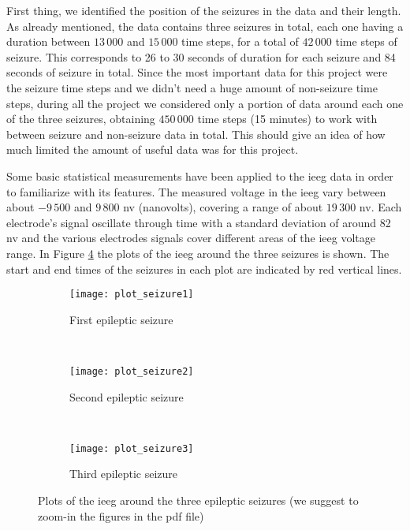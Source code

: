 First thing, we identified the position of the seizures in the data and their length. As already mentioned, the data contains three seizures in total, each one having a duration between $13\,000$ and $15\,000$ time steps, for a total of $42\,000$ time steps of seizure. This corresponds to 26 to 30 seconds of duration for each seizure and 84 seconds of seizure in total. Since the most important data for this project were the seizure time steps and we didn't need a huge amount of non-seizure time steps, during all the project we considered only a portion of data around each one of the three seizures, obtaining $450\,000$ time steps (15 minutes) to work with between seizure and non-seizure data in total. This should give an idea of how much limited the amount of useful data was for this project.

Some basic statistical measurements have been applied to the \acs{ieeg} data in order to familiarize with its features. The measured voltage in the \acs{ieeg} vary between about $-9\,500$ and $9\,800$ \acs{nv} (nanovolts), covering a range of about $19\,300$ \acs{nv}. Each electrode's signal oscillate through time with a standard deviation of around 82 \acs{nv} and the various electrodes signals cover different areas of the \acs{ieeg} voltage range. In Figure \ref{fig:plot_seizures} the plots of the \acs{ieeg} around the three seizures is shown. The start and end times of the seizures in each plot are indicated by red vertical lines.
\newpage
\begin{figure}[H]
    \centering
    \begin{subfigure}[t]{0.7\textwidth}
		\texttt{[image: plot\_seizure1]}
        \caption{First epileptic seizure}
        \label{fig:plot_seizure1}
	\end{subfigure}
	~
	\begin{subfigure}[t]{0.7\textwidth}
		\texttt{[image: plot\_seizure2]}
        \caption{Second epileptic seizure}
        \label{fig:plot_seizure2}
    \end{subfigure}
    ~
    \begin{subfigure}[t]{0.7\textwidth}
		\texttt{[image: plot\_seizure3]}
        \caption{Third epileptic seizure}
        \label{fig:plot_seizure3}
	\end{subfigure}
    \caption{Plots of the \acs{ieeg} around the three epileptic seizures (we suggest to zoom-in the figures in the pdf file)}
    \label{fig:plot_seizures}
\end{figure}
\newpage

